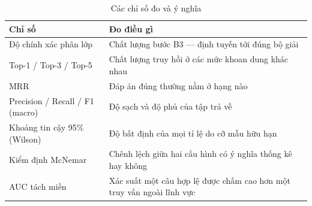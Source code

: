\begin{table}[H]
\centering
\caption{Các chỉ số đo và ý nghĩa}
\label{tab:chi-so}
\renewcommand{\arraystretch}{1.2}
\begin{tabularx}{\textwidth}{@{}>{\raggedright\arraybackslash}p{4.3cm} L@{}}
\toprule
\textbf{Chỉ số} & \textbf{Đo điều gì} \\
\midrule
Độ chính xác phân lớp & Chất lượng bước B3 --- định tuyến tới đúng bộ giải \\
Top-1 / Top-3 / Top-5 & Chất lượng truy hồi ở các mức khoan dung khác nhau \\
MRR & Đáp án đúng thường nằm ở hạng nào \\
Precision / Recall / F1 (macro) & Độ sạch và độ phủ của tập trả về \\
Khoảng tin cậy 95\% (Wilson) & Độ bất định của mọi tỉ lệ do cỡ mẫu hữu hạn \\
Kiểm định McNemar & Chênh lệch giữa hai cấu hình có ý nghĩa thống kê hay không \\
AUC tách miền & Xác suất một câu hợp lệ được chấm cao hơn một truy vấn ngoài lĩnh vực \\
\bottomrule
\end{tabularx}
\end{table}
